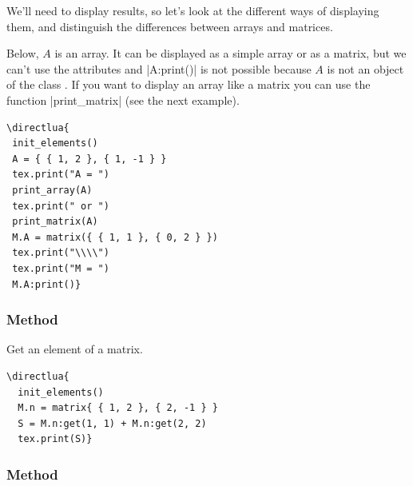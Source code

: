 We'll need to display results, so let's look at the different ways of displaying them, and distinguish the differences between arrays and matrices.

Below, $A$ is an array. It can be displayed as a simple array or as a matrix, but we can't use the attributes and |A:print()| is not possible because $A$ is not an object of the class . If you want to display an array like a matrix you can use the function |print_matrix| (see  the next example).

\vspace{.5em}
\begin{minipage}{.5\textwidth}
\begin{verbatim}
\directlua{
 init_elements()
 A = { { 1, 2 }, { 1, -1 } }
 tex.print("A = ")
 print_array(A)
 tex.print(" or ")
 print_matrix(A)
 M.A = matrix({ { 1, 1 }, { 0, 2 } })
 tex.print("\\\\")
 tex.print("M = ")
 M.A:print()}
\end{verbatim}
\end{minipage}
 \begin{minipage}{.5\textwidth}
 \end{minipage}

\subsubsection{Method  }
\label{ssub:get_an_element_of_a_matrix}
Get an element of a matrix.


\begin{minipage}{.5\textwidth}
\begin{verbatim}
\directlua{
  init_elements()
  M.n = matrix{ { 1, 2 }, { 2, -1 } }
  S = M.n:get(1, 1) + M.n:get(2, 2)
  tex.print(S)}
\end{verbatim}
\end{minipage}
\begin{minipage}{.5\textwidth}
\end{minipage}

\subsubsection{Method  }
\label{ssub:inverse_matrix}

